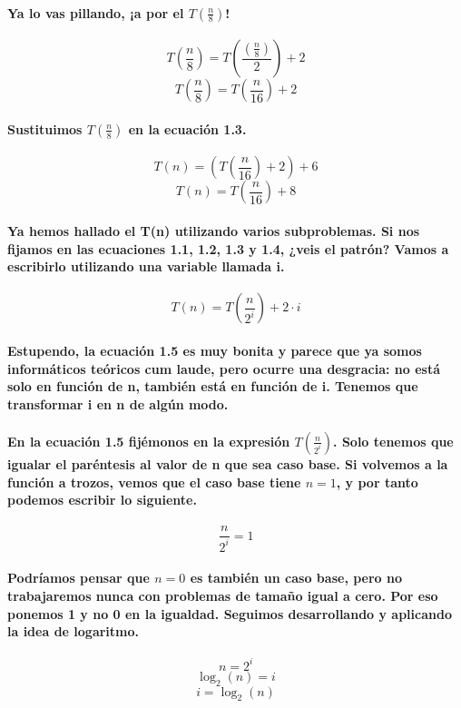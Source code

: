 \documentclass{book}
\begin{document}
	\paragraph{Ya lo vas pillando, ¡a por el $T(\frac{n}{8})$!}
	\begin{equation}
		T(\frac{n}{8}) = T(\frac{(\frac{n}{8})}{2}) + 2 \nonumber 
	\end{equation}
	\begin{equation}
		T(\frac{n}{8}) = T(\frac{n}{16}) + 2 \nonumber 
	\end{equation}	
	\paragraph{Sustituimos $T(\frac{n}{8})$ en la ecuación 1.3.}
	\begin{equation}
		T(n) = (T(\frac{n}{16}) + 2) + 6 \nonumber  
	\end{equation}	
	\begin{equation}
		T(n) = T(\frac{n}{16}) + 8 
	\end{equation}	
	\paragraph{Ya hemos hallado el T(n) utilizando varios subproblemas. Si nos fijamos en las ecuaciones 1.1, 1.2, 1.3 y 1.4, ¿veis el patrón? Vamos a escribirlo utilizando una variable llamada i.}
	\begin{equation}
		T(n) = T(\frac{n}{2^i}) + 2 \cdot i 
	\end{equation}
	\paragraph{Estupendo, la ecuación 1.5 es muy bonita y parece que ya somos informáticos teóricos cum laude, pero ocurre una desgracia: no está solo en función de n, también está en función de i. Tenemos que transformar i en n de algún modo.}
	\paragraph{En la ecuación 1.5 fijémonos en la expresión $T(\frac{n}{2^i})$. Solo tenemos que igualar el paréntesis al valor de n que sea caso base. Si volvemos a la función a trozos, vemos que el caso base tiene $n=1$, y por tanto podemos escribir lo siguiente.}
	\begin{equation}
		\frac{n}{2^i} = 1 \nonumber 
	\end{equation}
	\paragraph{Podríamos pensar que $n=0$ es también un caso base, pero no trabajaremos nunca con problemas de tamaño igual a cero. Por eso ponemos 1 y no 0 en la igualdad. Seguimos desarrollando y aplicando la idea de logaritmo.}
	\begin{equation}
	   	n = 2^i \nonumber 
	\end{equation}
	\begin{equation}
		\log_{2}(n) = i \nonumber 
	\end{equation}
	\begin{equation}
	   	i = \log_{2}(n) \nonumber 
	\end{equation}
\end{document}

